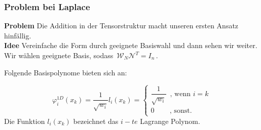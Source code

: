\begin{frame}
\frametitle{Problem bei Laplace}
\textbf{Problem } Die Addition in der Tensorstruktur macht unseren ersten Ansatz hinfällig. \\
\textbf{Idee } Vereinfache die Form durch geeignete Basiswahl und dann sehen wir weiter. Wir wählen geeignete Basis, sodass $ \, \mathcal{W}_N \mathcal{N}^{T} = I_n \, $.

Folgende Basispolynome bieten sich an:
\begin{framed}
\begin{equation*}
\varphi^{1D}_i (x_k) = \dfrac{1}{ \sqrt{w_i} } l_i (x_k) = 
\begin{cases}
\dfrac{1}{ \sqrt{w_i} } \, \text{ , wenn } i=k  \\
0  \, \, \, \, \, \, \, \, \, \, \, \text{ , sonst. }
\end{cases}
\end{equation*}
Die Funktion $l_i(x_k)$ bezeichnet das $i-te$ Lagrange Polynom.
\end{framed}
\end{frame}
